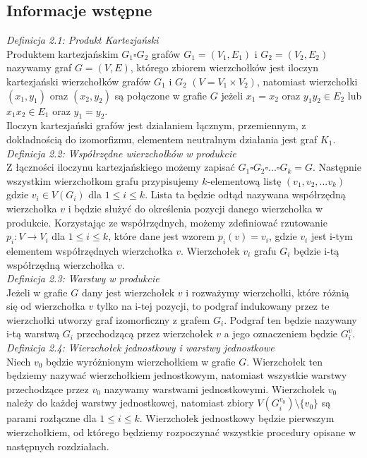 \documentclass[12pt,a4paper,titlepage]{article}
\begin{document}
\subsection{Informacje wstępne}
\textit{Definicja 2.1: Produkt Kartezjański}\\
Produktem kartezjańskim $G_1 \square G_2 $ grafów $G_1 = (V_1 , E_1 ) $ i $ G_2 =(V_2 , E_2 ) $ nazywamy graf $G = (V, E)$, którego zbiorem wierzchołków jest iloczyn kartezjański wierzchołków grafów $G_1$ i $G_2$ $(V=V_1 \times V_2 )$, natomiast wierzchołki $(x_1, y_1)$ oraz $(x_2, y_2)$ są połączone w grafie $G$ jeżeli $x_1 = x_2$ oraz $y_1 y_2 \in E_2 $ lub $x_1 x_2 \in E_1 $ oraz $y_1 = y_2 $.\\
Iloczyn kartezjański grafów jest działaniem łącznym, przemiennym, z dokładnością do izomorfizmu, elementem neutralnym działania jest graf $K_1$.\\
\textit{Definicja 2.2: Współrzędne wierzchołków w produkcie}\\
Z łączności iloczynu kartezjańskiego możemy zapisać $G_1 \square G_2 \square ... \square G_k = G$. Następnie wszystkim wierzchołkom grafu przypisujemy $k$-elementową listę $(v_1, v_2 , ... v_k )$ gdzie $v_i \in V(G_i)$ dla $1 \leqslant i \leqslant k $. Lista ta będzie odtąd nazywana współrzędną wierzchołka $v$ i będzie służyć do określenia pozycji danego wierzchołka w produkcie. Korzystając ze współrzędnych, możemy zdefiniować rzutowanie $p_i : V \rightarrow V_i $ dla $1 \leqslant i \leqslant k $, które dane jest wzorem $p_i (v) = v_i $, gdzie $v_i$ jest i-tym elementem współrzędnych wierzchołka $v$. Wierzchołek $v_i$ grafu $G_i$ będzie i-tą współrzędną wierzchołka $v$. \\
\textit{Definicja 2.3: Warstwy w produkcie}\\
Jeżeli w grafie $G$ dany jest wierzchołek $v$ i rozważymy wierzchołki, które różnią się od wierzchołka $v$ tylko na i-tej pozycji, to podgraf indukowany przez te wierzchołki utworzy graf izomorficzny z grafem $G_i$. Podgraf ten będzie nazywany i-tą warstwą $G_i$ przechodzącą przez wierzchołek $v$ a jego oznaczeniem będzie $G_i ^v$.\\
\textit{Definicja 2.4: Wierzchołek jednostkowy i warstwy jednostkowe}\\
Niech $v_0$ będzie wyróżnionym wierzchołkiem w grafie $G$. Wierzchołek ten będziemy nazywać wierzchołkiem jednostkowym, natomiast wszystkie warstwy przechodzące przez $v_0$ nazywamy warstwami jednostkowymi. Wierzchołek $v_0$ należy do każdej warstwy jednostkowej, natomiast zbiory $V(G_i ^{v_0}) \setminus \{v_0\}$ są parami rozłączne dla $1 \leqslant i \leqslant k $. Wierzchołek jednostkowy będzie pierwszym wierzchołkiem, od którego będziemy rozpoczynać wszystkie procedury opisane w następnych rozdziałach.
\end{document}
